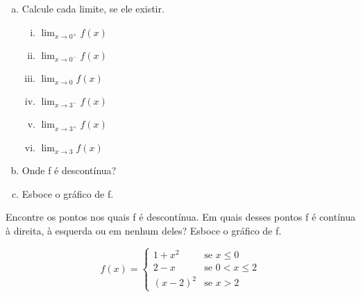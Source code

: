 \documentclass[12pt]{exam}
\begin{document}
\begin{questions}
\begin{enumerate}[(a)]
    \item Calcule cada limite, se ele existir.
    \begin{multicols}{3}
            \begin{enumerate}[(i)]
                \item $\displaystyle \lim_{x\to 0^+} f(x) $
                \item $\displaystyle \lim_{x\to 0^-} f(x) $
                \item $\displaystyle \lim_{x\to 0} f(x) $
                \item $\displaystyle \lim_{x\to 3^-} f(x) $
                \item $\displaystyle \lim_{x\to 3^+} f(x) $
                \item $\displaystyle \lim_{x\to 3} f(x) $
            \end{enumerate}
    \end{multicols}
    \item Onde f é descontínua?
    \item Esboce o gráfico de f.
\end{enumerate}

\question Encontre os pontos nos quais f é descontínua. Em quais desses pontos f é contínua à direita, à esquerda ou em nenhum deles? Esboce o gráfico de f.

\begin{equation}
    f(x) = \begin{cases}
        1 + x^2 & \text{se    }  x \leq 0 \\
        2 - x & \text{se    } 0 < x\leq 2 \\
        \left( x - 2 \right) ^2 & \text{se  } x > 2



    \end{cases}
\end{equation}


\end{questions}
\end{document}
